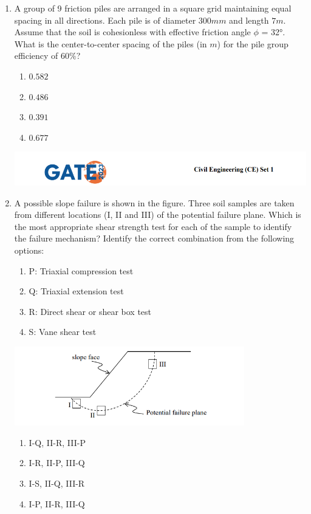 \documentclass[journal,14pt,onecolumn]{IEEEtran}
\theoremstyle{remark}
\begin{document}
\begin{enumerate}[label={Q\arabic*.}]
\item A group of 9 friction piles are arranged in a square grid maintaining equal spacing in all directions. Each pile is of diameter $300 mm$ and length $7 m$. Assume that the soil is cohesionless with effective friction angle $\phi$ = 32°. What is the center-to-center spacing of the piles (in $m$) for the pile group efficiency of $60\%$?
\begin{enumerate}
    \item $0.582$
    \item $0.486$
    \item $0.391$
    \item $0.677$
\end{enumerate}

\newpage

\includegraphics[width=\textwidth]{pics/header.png}
\item A possible slope failure is shown in the figure. Three soil samples are taken from different locations (I, II and III) of the potential failure plane. Which is the most appropriate shear strength test for each of the sample to identify the failure mechanism? Identify the correct combination from the following options:
\noindent
\begin{enumerate}
    \item P: Triaxial compression test
    \item Q: Triaxial extension test
    \item R: Direct shear or shear box test
    \item S: Vane shear test
\end{enumerate}
\vspace{0.15cm}
\includegraphics[width=10cm]{pics/Screenshot 2025-08-02 145925.png}
\begin{enumerate}
    \item I-Q, II-R, III-P
    \item I-R, II-P, III-Q
    \item I-S, II-Q, III-R
    \item I-P, II-R, III-Q
\end{enumerate}
\vspace{1cm}


\end{enumerate}
\end{document}
